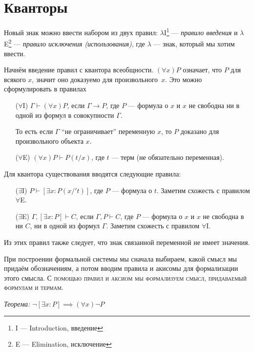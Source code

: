 \section{Кванторы}

\newcommand\Aii{$\forall$I}
\newcommand\Aee{$\forall$E}
\newcommand\Eii{$\exists$I}
\newcommand\Eee{$\exists$E}

Новый знак можно ввести набором из двух правил:
$\lambda$I\footnote{I --- Introduction, введение} --- {\it правило введения}
и $\lambda$E\footnote{E --- Elimination, исключение} --- {\it правило
исключения (использования)}, где $\lambda$ --- знак, который мы хотим ввести.

Начнём введение правил с квантора всеобщности. $(\forall x)P$ означает, что $P$ для
всякого $x$, значит оно доказуемо для произвольного~$x$. Это можно сформулировать
в правилах
\begin{enumerate}
	\item[(\Aii{})]{}$\Gamma\vdash(\forall x)P$, если ${\Gamma\to P}$, где
	$P$ --- формула о $x$ и $x$ не свободна ни в одной из формул в совокупности $\Gamma$.

	То есть если $\Gamma$ ``не ограничивает'' переменную $x$,
	то $P$ доказано для произвольного объекта $x$.

	\item[(\Aee{})]{}$(\forall x)P\vdash P(t/x)$, где $t$ --- терм
	(не обязательно переменная).
\end{enumerate}

Для квантора существования вводятся следующие правила:
\begin{enumerate}
	\item[(\Eii{})]${P\vdash [\exists x:P(x/'t)]}$, где $P$ --- формула о $t$.
	Заметим схожесть с правилом $\forall$E.

	\item[(\Eee{})]${\Gamma, [\exists x:P]\vdash C}$, если $\Gamma, P\vdash C$,
	где $P$ --- формула о $x$ и $x$ не свободна в ни $C$, ни в одной из формул $\Gamma$.
	Заметим схожесть с правилом $\forall$I.
\end{enumerate}

Из этих правил также следует, что знак связанной переменной не имеет значения.

При построении формальной системы мы сначала
выбираем, какой смысл мы придаём обозначениям, а потом вводим
правила и акисомы для формализации этого смысла.
\textsc{С помощью правил и аксиом мы формализуем смысл, придаваемый формулам и термам.}

\vspace{1em}
{\it Теорема:} $\lnot [\exists x:P]\implies  (\forall x)\lnot P$

